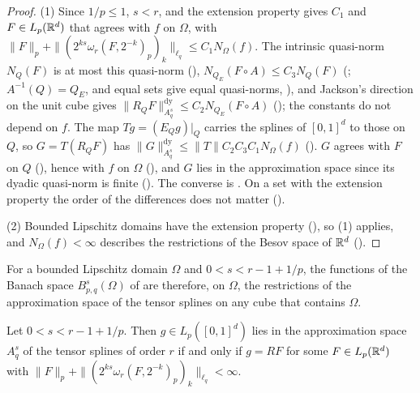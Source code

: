 \begin{proof}
\leanok
{}
(1) Since $1/p \leq 1$, $s < r$, and the extension property gives $C_1$ and $F \in L_p(\mathbb{R}^d)$
that agrees with $f$ on $\Omega$, with $\|F\|_p + \|(2^{ks} \omega_r(F, 2^{-k})_p)_k\|_{\ell_q}
\leq C_1 N_\Omega(f)$. The intrinsic quasi-norm $N_Q(F)$ is at most this quasi-norm
(), $N_{Q_E}(F \circ A) \leq C_3 N_Q(F)$
(; $A^{-1}(Q) = Q_E$, and equal sets give equal quasi-norms,
), and Jackson's direction on the unit cube gives
$\|R_Q F\|^{\mathrm{dy}}_{A^s_q} \leq C_2 N_{Q_E}(F \circ A)$
(); the constants do not depend on $f$. The map
$T g = (E_Q g)|_Q$ carries the splines of $[0, 1]^d$ to those on $Q$, so $G = T(R_Q F)$ has
$\|G\|^{\mathrm{dy}}_{A^s_q} \leq \|T\| C_2 C_3 C_1 N_\Omega(f)$ ().
$G$ agrees with $F$ on $Q$ (), hence with $f$ on $\Omega$
(), and $G$ lies in the approximation space since its dyadic
quasi-norm is finite (). The converse is
. On a set with the extension property the order of the
differences does not matter ().

(2) Bounded Lipschitz domains have the extension property
(), so (1) applies, and $N_\Omega(f) < \infty$
describes the restrictions of the Besov space of $\mathbb{R}^d$ ().
\end{proof}

For a bounded Lipschitz domain $\Omega$ and $0 < s < r - 1 + 1/p$, the functions of the Banach
space $B^s_{p,q}(\Omega)$ of  are therefore, on $\Omega$, the
restrictions of the approximation space of the tensor splines on any cube that contains
$\Omega$.

\begin{theorem}
\label{thm:cube-splines-restriction}
\leanok
{}
Let $0 < s < r - 1 + 1/p$. Then $g \in L_p([0, 1]^d)$ lies in the approximation space $A^s_q$
of the tensor splines of order $r$ if and only if $g = R F$ for some $F \in L_p(\mathbb{R}^d)$ with
$\|F\|_p + \|(2^{ks} \omega_r(F, 2^{-k})_p)_k\|_{\ell_q} < \infty$.
\end{theorem}

